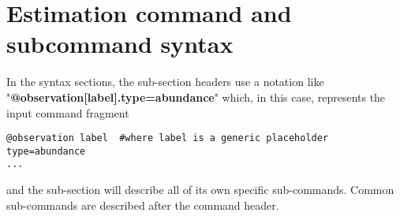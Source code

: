 \subsection{}


\subsection{}


\subsection{}


\subsection{}


\subsection{}


\section{Estimation command and subcommand syntax\label{sec:estimation-syntax}}

In the syntax sections, the sub-section headers use a notation like "\textbf {@observation[label].type=abundance}" which, in this case, represents the input command fragment
{\small{\begin{verbatim}
@observation label  #where label is a generic placeholder
type=abundance
...
\end{verbatim}}}
and the sub-section will describe all of its own specific sub-commands. Common sub-commands are described after the command header.

\subsection{}


\subsection{}



